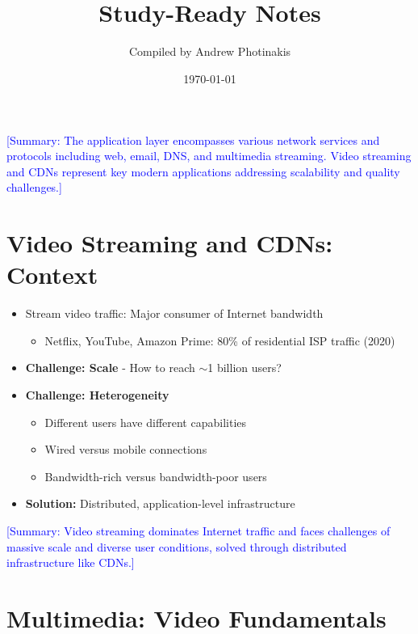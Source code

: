 \documentclass[12pt]{article}
\title{\TOPICTITLE\\\large Study-Ready Notes}
\author{Compiled by Andrew Photinakis}
\date{\today}
\begin{document}
\maketitle
\tableofcontents
\newpage


\textcolor{blue}{[Summary: The application layer encompasses various network services and protocols including web, email, DNS, and multimedia streaming. Video streaming and CDNs represent key modern applications addressing scalability and quality challenges.]}

\section{Video Streaming and CDNs: Context}
\begin{itemize}
    \item Stream video traffic: Major consumer of Internet bandwidth
          \begin{itemize}
              \item Netflix, YouTube, Amazon Prime: 80\% of residential ISP traffic (2020)
          \end{itemize}

    \item \textbf{Challenge: Scale} - How to reach $\sim$1 billion users?
    \item \textbf{Challenge: Heterogeneity}
          \begin{itemize}
              \item Different users have different capabilities
              \item Wired versus mobile connections
              \item Bandwidth-rich versus bandwidth-poor users
          \end{itemize}

    \item \textbf{Solution:} Distributed, application-level infrastructure
\end{itemize}

\textcolor{blue}{[Summary: Video streaming dominates Internet traffic and faces challenges of massive scale and diverse user conditions, solved through distributed infrastructure like CDNs.]}

\section{Multimedia: Video Fundamentals}
\end{document}
